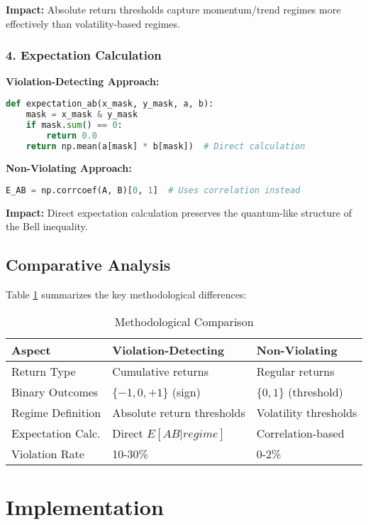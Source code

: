 \documentclass[11pt,a4paper]{article}
\begin{document}
\textbf{Impact:} Absolute return thresholds capture momentum/trend regimes more effectively than volatility-based regimes.

\subsubsection{4. Expectation Calculation}

\textbf{Violation-Detecting Approach:}
\begin{lstlisting}[language=Python]
def expectation_ab(x_mask, y_mask, a, b):
    mask = x_mask & y_mask
    if mask.sum() == 0:
        return 0.0
    return np.mean(a[mask] * b[mask])  # Direct calculation
\end{lstlisting}

\textbf{Non-Violating Approach:}
\begin{lstlisting}[language=Python]
E_AB = np.corrcoef(A, B)[0, 1]  # Uses correlation instead
\end{lstlisting}

\textbf{Impact:} Direct expectation calculation preserves the quantum-like structure of the Bell inequality.

\subsection{Comparative Analysis}

Table \ref{tab:comparison} summarizes the key methodological differences:

\begin{table}[h]
\centering
\caption{Methodological Comparison}
\label{tab:comparison}
\begin{tabular}{@{}lll@{}}
\toprule
\textbf{Aspect} & \textbf{Violation-Detecting} & \textbf{Non-Violating} \\
\midrule
Return Type & Cumulative returns & Regular returns \\
Binary Outcomes & $\{-1, 0, +1\}$ (sign) & $\{0, 1\}$ (threshold) \\
Regime Definition & Absolute return thresholds & Volatility thresholds \\
Expectation Calc. & Direct $E[AB|regime]$ & Correlation-based \\
Violation Rate & 10-30\% & 0-2\% \\
\bottomrule
\end{tabular}
\end{table}

\section{Implementation}
\end{document}
